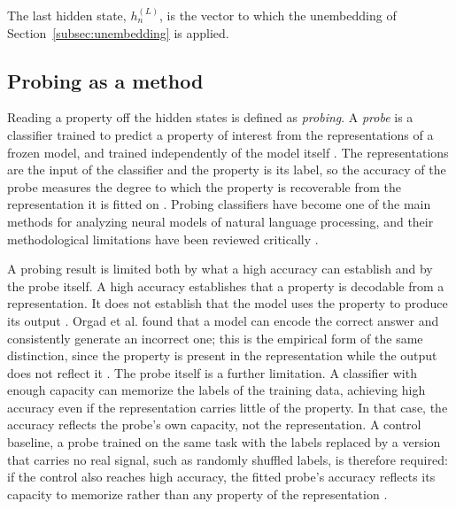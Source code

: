 The last hidden state, $h^{(L)}_n$, is the vector to which the unembedding of Section~\ref{subsec:unembedding} is applied.

\subsection{Probing as a method}
\label{subsec:probing-method}

Reading a property off the hidden states is defined as \emph{probing}. A \emph{probe} is a classifier trained to predict a property of interest from the representations of a frozen model, and trained independently of the model itself \cite{alainUnderstandingIntermediateLayers2018a}. The representations are the input of the classifier and the property is its label, so the accuracy of the probe measures the degree to which the property is recoverable from the representation it is fitted on \cite{alainUnderstandingIntermediateLayers2018a}. Probing classifiers have become one of the main methods for analyzing neural models of natural language processing, and their methodological limitations have been reviewed critically \cite{belinkovProbingClassifiersPromises2021a}.

A probing result is limited both by what a high accuracy can establish and by the probe itself. A high accuracy establishes that a property is decodable from a representation. It does not establish that the model uses the property to produce its output \cite{belinkovProbingClassifiersPromises2021a}. Orgad et al. found that a model can encode the correct answer and consistently generate an incorrect one; this is the empirical form of the same distinction, since the property is present in the representation while the output does not reflect it \cite{orgadLLMsKnowMore2025}. The probe itself is a further limitation. A classifier with enough capacity can memorize the labels of the training data, achieving high accuracy even if the representation carries little of the property. In that case, the accuracy reflects the probe's own capacity, not the representation. A control baseline, a probe trained on the same task with the labels replaced by a version that carries no real signal, such as randomly shuffled labels, is therefore required: if the control also reaches high accuracy, the fitted probe's accuracy reflects its capacity to memorize rather than any property of the representation \cite{belinkovProbingClassifiersPromises2021a}.

